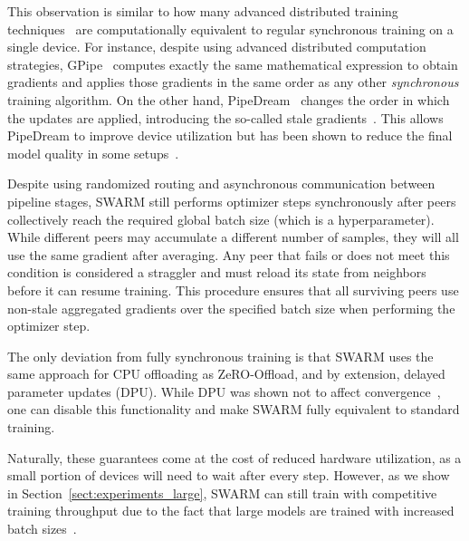 \vspace{2pt}

This observation is similar to how many advanced distributed training techniques~\citep{huang2019gpipe,zero} are computationally equivalent to regular synchronous training on a single device. For instance, despite using advanced distributed computation strategies, GPipe~\citep{huang2019gpipe} computes exactly the same mathematical expression to obtain gradients and applies those gradients in the same order as any other \textit{synchronous} training algorithm. On the other hand, PipeDream~\citep{pipedream} changes the order in which the updates are applied, introducing the so-called stale gradients~\citep{recht2011hogwild}. This allows PipeDream to improve device utilization but has been shown to reduce the final model quality in some setups~\citep{MLSYS2020_96da2f59}.

\vspace{2pt}

Despite using randomized routing and asynchronous communication between pipeline stages, SWARM still performs optimizer steps synchronously after peers collectively reach the required global batch size (which is a hyperparameter). While different peers may accumulate a different number of samples, they will all use the same gradient after averaging. 
Any peer that fails or does not meet this condition is considered a straggler and must reload its state from neighbors before it can resume training.
This procedure ensures that all surviving peers use non-stale aggregated gradients over the specified batch size when performing the optimizer step. 

\vspace{2pt}

The only deviation from fully synchronous training is that SWARM uses the same approach for CPU offloading as ZeRO-Offload, and by extension, delayed parameter updates (DPU). While DPU was shown not to affect convergence~\citep{zerooffload,stich2020error,arjevani2020tight}, one can disable this functionality and make SWARM fully equivalent to standard training.

\vspace{2pt}

Naturally, these guarantees come at the cost of reduced hardware utilization, as a small portion of devices will need to wait after every step. However, as we show in Section~\ref{sect:experiments_large}, SWARM can still train with competitive training throughput due to the fact that large models are trained with increased batch sizes~\citep{gpt3}.

